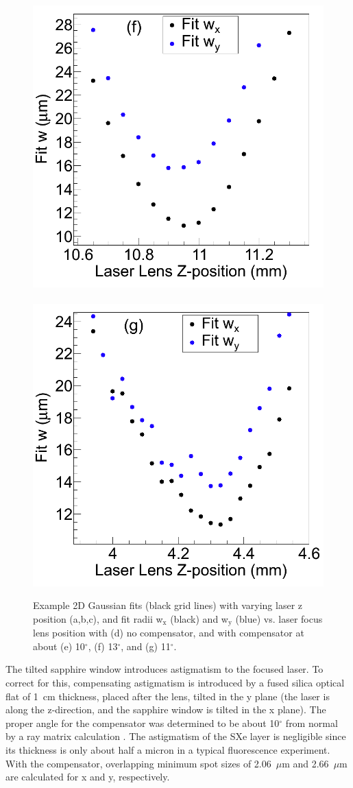 \begin{figure}
                \includegraphics[width=.45\textwidth]{figures/astigcorr_curve_corr_13deg.png}
                ~
                \includegraphics[width=.45\textwidth]{figures/astigcorr_curve_corr_9-16.png}
                \caption{Example 2D Gaussian fits (black grid lines) with varying laser z position (a,b,c), and fit radii  w$_{\text{x}}$ (black) and  w$_{\text{y}}$ (blue) vs. laser focus lens position with (d) no compensator, and with compensator at about (e) 10$^{\circ}$, (f) 13$^{\circ}$, and (g) 11$^{\circ}$.}
\label{fig:astig}
\end{figure}	

The tilted sapphire window introduces astigmatism to the focused laser.  To correct for this, compensating astigmatism is introduced by a fused silica optical flat of 1~cm thickness, placed after the lens, tilted in the y plane (the laser is along the z-direction, and the sapphire window is tilted in the x plane).  The proper angle for the compensator was determined to be about 10$^{\circ}$ from normal by a ray matrix calculation \cite{raymatrix}.  The astigmatism of the SXe layer is negligible since its thickness is only about half a micron in a typical fluorescence experiment.  With the compensator, overlapping minimum spot sizes of 2.06~$\mu$m and 2.66~$\mu$m are calculated for x and y, respectively.

